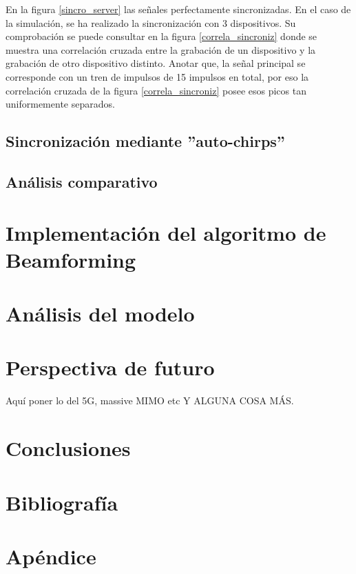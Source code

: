 \documentclass[a4paper,11pt]{book}
\begin{document}
En la figura \ref{sincro_server} las señales perfectamente sincronizadas. En el caso de la simulación, se ha realizado la sincronización con 3 dispositivos. Su comprobación se puede consultar en la figura \ref{correla_sincroniz} donde se muestra una correlación cruzada entre la grabación de un dispositivo y la grabación de otro dispositivo distinto. Anotar que, la señal principal se corresponde con un tren de impulsos de 15 impulsos en total, por eso la correlación cruzada de la figura \ref{correla_sincroniz} posee esos picos tan uniformemente separados.



\section{Sincronización mediante ''auto-chirps''}
\section{Análisis comparativo}


\chapter{Implementación del algoritmo de Beamforming}

\chapter{Análisis del modelo}

\chapter{Perspectiva de futuro}
Aquí poner lo del 5G, massive MIMO etc Y ALGUNA COSA MÁS.
\chapter{Conclusiones}

\chapter{Bibliografía}



\chapter{Apéndice}
\end{document}
